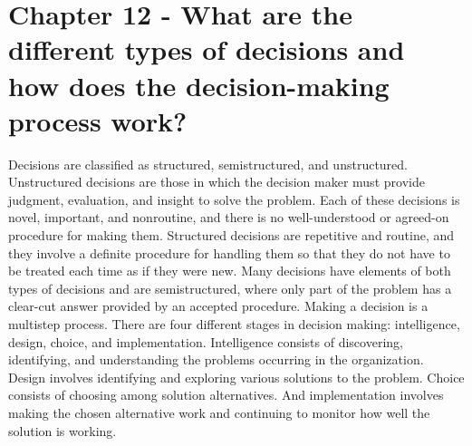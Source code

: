 \documentclass[12pt]{article}
\begin{document}
\section{Chapter 12 - What are the different types of decisions and how does the decision-making process work?}
Decisions are classified as structured, semistructured, and unstructured. Unstructured decisions are those in which the decision maker must provide judgment, evaluation, and insight to solve the problem. Each of these decisions is novel, important, and nonroutine, and there is no well-understood or agreed-on procedure for making them. Structured decisions are repetitive and routine, and they involve a definite procedure for handling them so that they do not have to be treated each time as if they were new. Many decisions have elements of both types of decisions and are semistructured, where only part of the problem has a clear-cut answer provided by an accepted procedure. Making a decision is a multistep process. There are four different stages in decision making: intelligence, design, choice, and implementation. Intelligence consists of discovering, identifying, and understanding the problems occurring in the organization. Design involves identifying and exploring various solutions to the problem. Choice consists of choosing among solution alternatives. And implementation involves making the chosen alternative work and continuing to monitor how well the solution is working. 
\end{document}
